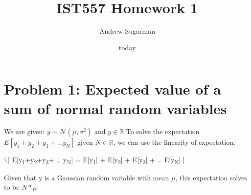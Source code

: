 \documentclass[11pt]{article}
\author{Andrew Sugarman}
\date{today}
\title{IST557 Homework 1}
\begin{document}
\maketitle
\tableofcontents

\section{Problem 1: Expected value of a sum of normal random variables}
\label{sec:org769745e}
We are given: \(y \sim \mathcal{N}(\mu, \sigma^2)\) and \(y \in \mathbb{R}\)
To solve the expectation \(E[y_{1}+y_{2}+y_{3}+ ... y_{N}]\) given \(N \in \mathbb{R}\), we can use the linearity of expectation:

$\backslash$[
E[y\textsubscript{1}+y\textsubscript{2}+y\textsubscript{3}+ \ldots{} y\textsubscript{N}] = E[y\textsubscript{1}] + E[y\textsubscript{2}] + E[y\textsubscript{3}] + \ldots{} E[y\textsubscript{N}]
]

Given that y is a Gaussian random variable with mean \(\mu\), this expectation solves to be \(N*\mu\)
\end{document}
